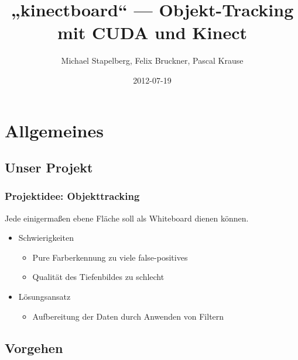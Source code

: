 \documentclass[compress]{beamer}
\title{„kinectboard“ — Objekt-Tracking\\mit CUDA und Kinect}
\author{Michael Stapelberg, Felix Bruckner, Pascal Krause}
\institute{Fakultät für Informatik\\
           Hochschule Mannheim\\}
\date{2012-07-19}
\begin{document}
\begin{frame}
\titlepage
\end{frame}

\begin{frame}
  \tableofcontents                       %
\end{frame}

\section{Allgemeines}
\subsection{Unser Projekt}
\begin{frame}
\frametitle{Projektidee: Objekttracking}

Jede einigermaßen ebene Fläche soll als Whiteboard dienen können.

\begin{itemize}
	\item Schwierigkeiten
	\begin{itemize}
		\item Pure Farberkennung zu viele false-positives
		\item Qualität des Tiefenbildes zu schlecht
	\end{itemize}
	\item Lösungsansatz
		\begin{itemize}
		\item Aufbereitung der Daten durch Anwenden von Filtern
	\end{itemize}
\end{itemize}
\end{frame}

%
%

\subsection{Vorgehen}
\end{document}
